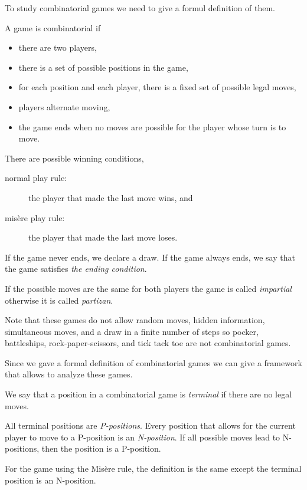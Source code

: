 To study combinatorial games we need to give a formul definition of them.
\begin{definition}
  A game is combinatorial if
  \begin{itemize}
    \item there are two players,
    \item there is a set of possible positions in the game,
    \item for each position and each player, there is a fixed set of possible
      legal moves,
    \item players alternate moving,
    \item the game ends when no moves are possible for the player whose
      turn is to move.
  \end{itemize}
  There are possible winning conditions,
  \begin{description}
    \item [normal play rule:] the player that made the last move wins, and
    \item [mis\`ere play rule:] the player that made the last move loses.
  \end{description}
  If the game never ends, we declare a draw. If the game always ends, we
  say that the game satisfies \emph{the ending condition}.

  If the possible moves are the same for both players the game is
  called \emph{impartial} otherwise it is called \emph{partizan}.
\end{definition}

Note that these games do not allow random moves, hidden information,
simultaneous moves, and a draw in a finite number of steps so
pocker, battleships, rock-paper-scissors, and tick tack toe are not
combinatorial games.

Since we gave a formal definition of combinatorial games we can give a framework
that allows to analyze these games.
\begin{definition}
  We say that a position in a combinatorial game is \emph{terminal} if there
  are no legal moves.

  All terminal positions are \emph{P-positions}. Every position that allows for
  the current player to move to a P-position is an \emph{N-position}. If all
  possible moves lead to N-positions, then the position is a P-position.

  For the game using the Mis\`ere rule, the definition is the same except the
  terminal position is an N-position.
\end{definition}

